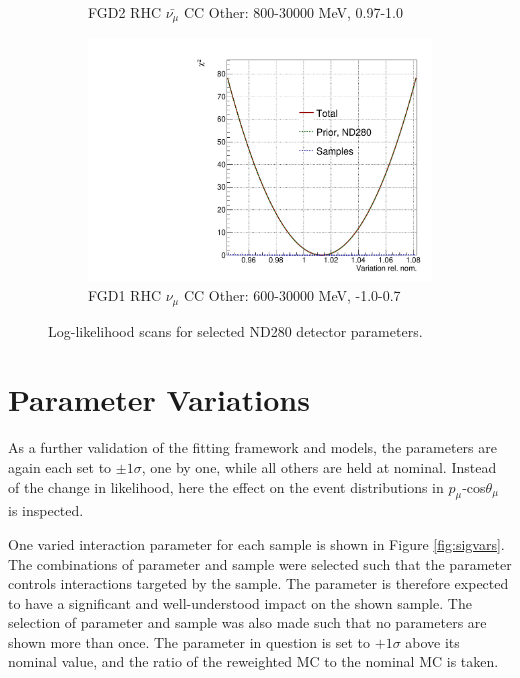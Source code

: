 \begin{figure}
\begin{subfigure}{.49\textwidth}
  \caption{FGD2 RHC $\bar{\nu_{\mu}}$ CC Other: 800-30000 MeV, 0.97-1.0}
\end{subfigure}
\begin{subfigure}{.49\textwidth}
  \centering
  \includegraphics[width=0.7\linewidth]{figs/llh/ndd_556_llh.pdf}
  \caption{FGD1 RHC $\nu_{\mu}$ CC Other: 600-30000 MeV, -1.0-0.7}
\end{subfigure}
\caption{Log-likelihood scans for selected ND280 detector parameters.}
\label{fig:llhdet}
\end{figure}

\section{Parameter Variations}\label{sec:sigvar}

As a further validation of the fitting framework and models, the parameters are again each set to $\pm1\sigma$, one by one, while all others are held at nominal. Instead of the change in likelihood, here the effect on the event distributions in $p_{\mu}$-cos$\theta_{\mu}$ is inspected. 

One varied interaction parameter for each sample is shown in Figure \ref{fig:sigvars}. The combinations of parameter and sample were selected such that the parameter controls interactions targeted by the sample. The parameter is therefore expected to have a significant and well-understood impact on the shown sample. The selection of parameter and sample was also made such that no parameters are shown more than once. The parameter in question is set to $+1\sigma$ above its nominal value, and the ratio of the reweighted MC to the nominal MC is taken.


